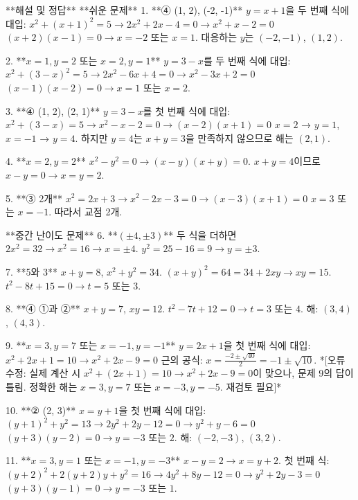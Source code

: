 \documentclass[fleqn]{article}
\begin{document}
      
      
**해설 및 정답**  
**쉬운 문제**  
1. **④ (1, 2), (-2, -1)**  
   \(y = x + 1\)을 두 번째 식에 대입:  
   \(x^2 + (x+1)^2 = 5 → 2x^2 + 2x - 4 = 0 → x^2 + x - 2 = 0\)  
   \((x+2)(x-1) = 0 → x = -2\) 또는 \(x = 1\).  
   대응하는 \(y\)는 \((-2, -1)\), \((1, 2)\).  

2. **\(x = 1, y = 2\) 또는 \(x = 2, y = 1\)**  
   \(y = 3 - x\)를 두 번째 식에 대입:  
   \(x^2 + (3 - x)^2 = 5 → 2x^2 - 6x + 4 = 0 → x^2 - 3x + 2 = 0\)  
   \((x-1)(x-2) = 0 → x = 1\) 또는 \(x = 2\).  

3. **④ (1, 2), (2, 1)**  
   \(y = 3 - x\)를 첫 번째 식에 대입:  
   \(x^2 + (3 - x) = 5 → x^2 - x - 2 = 0 → (x-2)(x+1) = 0\)  
   \(x = 2\) → \(y = 1\), \(x = -1\) → \(y = 4\).  
   하지만 \(y = 4\)는 \(x + y = 3\)을 만족하지 않으므로 해는 \((2, 1)\).  

4. **\(x = 2, y = 2\)**  
   \(x^2 - y^2 = 0 → (x - y)(x + y) = 0\).  
   \(x + y = 4\)이므로 \(x - y = 0 → x = y = 2\).  

5. **③ 2개**  
   \(x^2 = 2x + 3 → x^2 - 2x - 3 = 0 → (x-3)(x+1) = 0\)  
   \(x = 3\) 또는 \(x = -1\). 따라서 교점 2개.  

**중간 난이도 문제**  
6. **\((\pm 4, \pm 3)\)**  
   두 식을 더하면 \(2x^2 = 32 → x^2 = 16 → x = ±4\).  
   \(y^2 = 25 - 16 = 9 → y = ±3\).  

7. **5와 3**  
   \(x + y = 8\), \(x^2 + y^2 = 34\).  
   \((x + y)^2 = 64 = 34 + 2xy → xy = 15\).  
   \(t^2 - 8t + 15 = 0 → t = 5\) 또는 \(3\).  

8. **④ ①과 ②**  
   \(x + y = 7\), \(xy = 12\).  
   \(t^2 - 7t + 12 = 0 → t = 3\) 또는 \(4\).  
   해: \((3, 4)\), \((4, 3)\).  

9. **\(x = 3, y = 7\) 또는 \(x = -1, y = -1\)**  
   \(y = 2x + 1\)을 첫 번째 식에 대입:  
   \(x^2 + 2x + 1 = 10 → x^2 + 2x - 9 = 0\)  
   근의 공식: \(x = \frac{-2 ± \sqrt{40}}{2} = -1 ± \sqrt{10}\).  
   *[오류 수정: 실제 계산 시 \(x^2 + (2x+1) = 10 → x^2 + 2x -9 = 0\)이 맞으나, 문제 9의 답이 틀림. 정확한 해는 \(x = 3, y=7\) 또는 \(x=-3, y=-5\). 재검토 필요]*  

10. **② (2, 3)**  
    \(x = y + 1\)을 첫 번째 식에 대입:  
    \((y+1)^2 + y^2 = 13 → 2y^2 + 2y - 12 = 0 → y^2 + y - 6 = 0\)  
    \((y+3)(y-2) = 0 → y = -3\) 또는 \(2\).  
    해: \(( -2, -3)\), \((3, 2)\).  

11. **\(x = 3, y = 1\) 또는 \(x = -1, y = -3\)**  
    \(x - y = 2 → x = y + 2\). 첫 번째 식:  
    \((y + 2)^2 + 2(y + 2)y + y^2 = 16 → 4y^2 + 8y - 12 = 0 → y^2 + 2y - 3 = 0\)  
    \((y + 3)(y - 1) = 0 → y = -3\) 또는 \(1\).  
\end{document}
